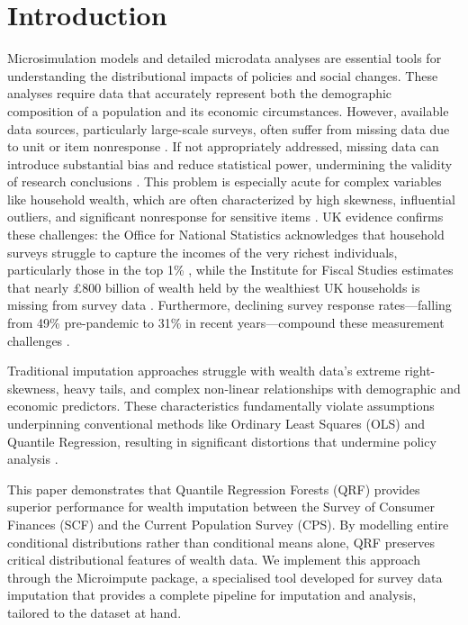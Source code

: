 \section{Introduction}

Microsimulation models and detailed microdata analyses are essential tools for understanding the distributional impacts of policies and social changes. These analyses require data that accurately represent both the demographic composition of a population and its economic circumstances. However, available data sources, particularly large-scale surveys, often suffer from missing data due to unit or item nonresponse \citep{dempster1983introduction}. If not appropriately addressed, missing data can introduce substantial bias and reduce statistical power, undermining the validity of research conclusions \citep{graham2009missing}. This problem is especially acute for complex variables like household wealth, which are often characterized by high skewness, influential outliers, and significant nonresponse for sensitive items \citep{barcelo2008impact}. UK evidence confirms these challenges: the Office for National Statistics acknowledges that household surveys struggle to capture the incomes of the very richest individuals, particularly those in the top 1\% \citep{ons2019using}, while the Institute for Fiscal Studies estimates that nearly £800 billion of wealth held by the wealthiest UK households is missing from survey data \citep{crawford2016distribution}. Furthermore, declining survey response rates—falling from 49\% pre-pandemic to 31\% in recent years—compound these measurement challenges \citep{ifs2025new}.

Traditional imputation approaches struggle with wealth data's extreme right-skewness, heavy tails, and complex non-linear relationships with demographic and economic predictors. These characteristics fundamentally violate assumptions underpinning conventional methods like Ordinary Least Squares (OLS) and Quantile Regression, resulting in significant distortions that undermine policy analysis \citep{meinshausen2006quantile}.

This paper demonstrates that Quantile Regression Forests (QRF) provides superior performance for wealth imputation between the Survey of Consumer Finances (SCF) and the Current Population Survey (CPS). By modelling entire conditional distributions rather than conditional means alone, QRF preserves critical distributional features of wealth data. We implement this approach through the Microimpute package, a specialised tool developed for survey data imputation that provides a complete pipeline for imputation and analysis, tailored to the dataset at hand.

